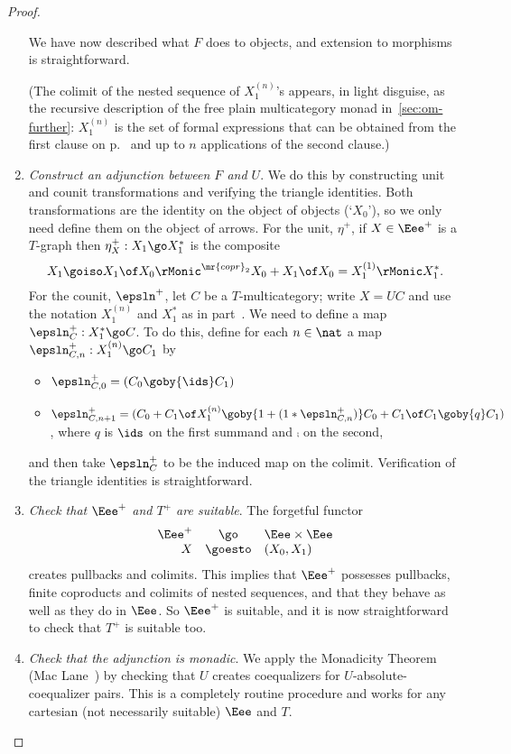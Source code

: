 \begin{proof}
\begin{enumerate}
We have now described what $F$ does to objects, and extension to morphisms
is straightforward.

(The colimit of the nested sequence of $X_1^{(n)}$'s appears, in light
disguise, as the recursive description of the free plain%
%
%
multicategory
monad in~\ref{sec:om-further}: $X_1^{(n)}$ is the set of formal expressions
that can be obtained from the first clause on
p.~\pageref{p:free-plain-clauses} and up to $n$ applications of the second
clause.)

\item \emph{Construct an adjunction between $F$ and $U$}.  We do this by
constructing unit and counit transformations and verifying the triangle
identities.  Both transformations are the identity on the object of objects
(`$X_0$'), so we only need define them on the object of arrows.  For the
unit, $\eta^+$, if $X\in\Eee^+$ is a $T$-graph then $\eta^+_X: X_1 \go
X_1^*$ is the composite
\[
X_1 \goiso X_1 \of X_0 \rMonic^{\mr{copr}_2} X_0 + X_1 \of X_0 = X_1^{(1)}
\rMonic X_1^*.
\]
For the counit, $\epsln^+$, let $C$ be a $T$-multicategory; write $X =
UC$ and use the notation $X_1^{(n)}$ and $X_1^*$ as in part~.
We need to define a map $\epsln^+_C: X_1^* \go C$.  To do this,
define for each $n\in\nat$ a map $\epsln^+_{C,n}: X_1^{(n)} \go C_1$ by 
%
\begin{itemize}
\item $\epsln^+_{C,0} = (C_0 \goby{\ids} C_1)$
\item $\epsln^+_{C,n+1} = 
(C_0 + C_1 \of X_1^{(n)} 
\goby{1+(1*\epsln^+_{C,n})} 
C_0 + C_1 \of C_1 
\goby{q} 
C_1)$, where $q$ is $\ids$ on the first summand and $\comp$ on the second,
\end{itemize}
%
and then take $\epsln^+_C$ to be the induced map on the colimit.
Verification of the triangle identities is straightforward.

\item \emph{Check that $\Eee^+$ and $T^+$ are suitable}.  The forgetful
functor
\[
\begin{array}{rcl}
\Eee^+ 	&\go		&\Eee \times \Eee	\\
X	&\goesto	&(X_0, X_1)		\\
\end{array}
\]
creates pullbacks and colimits.  This implies that $\Eee^+$ possesses
pullbacks, finite coproducts and colimits of nested sequences, and that
they behave as well as they do in $\Eee$.  So $\Eee^+$ is suitable, and it
is now straightforward to check that $T^+$ is suitable too.

\item \emph{Check that the adjunction is monadic}.  We apply the Monadicity
Theorem (Mac Lane~\cite[VI.7]{MacCWM}) by checking that $U$ creates
coequalizers for $U$-absolute-coequalizer pairs.  This is a completely
routine procedure and works for any cartesian (not necessarily suitable)
$\Eee$ and $T$.
\done
\end{enumerate}
%
\end{proof}

